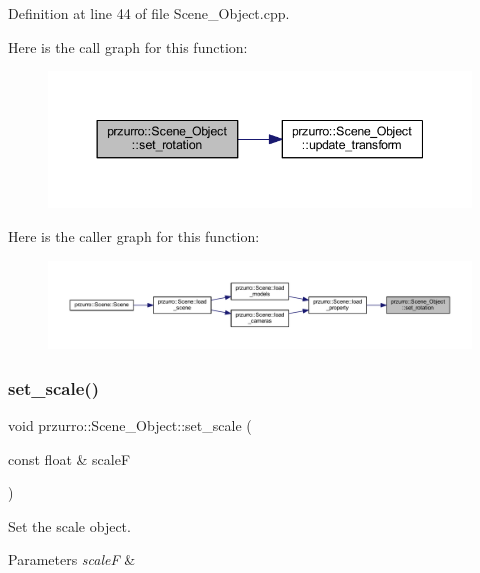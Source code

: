 Definition at line 44 of file Scene\+\_\+\+Object.\+cpp.

Here is the call graph for this function\+:
\nopagebreak
\begin{figure}[H]
\begin{center}
\leavevmode
\includegraphics[width=344pt]{d9/d84/classprzurro_1_1_scene___object_afda0a69deccf91508a1781418d2c3497_cgraph}
\end{center}
\end{figure}
Here is the caller graph for this function\+:
\nopagebreak
\begin{figure}[H]
\begin{center}
\leavevmode
\includegraphics[width=350pt]{d9/d84/classprzurro_1_1_scene___object_afda0a69deccf91508a1781418d2c3497_icgraph}
\end{center}
\end{figure}
\mbox{\label{classprzurro_1_1_scene___object_a76e1fb5b58218b916a45c04101186ac7}} 
\subsubsection{\texorpdfstring{set\_scale()}{set\_scale()}}
{\footnotesize\ttfamily void przurro\+::\+Scene\+\_\+\+Object\+::set\+\_\+scale (\begin{DoxyParamCaption}\item[{const float \&}]{scaleF }\end{DoxyParamCaption})}



Set the scale object. 


\begin{DoxyParams}{Parameters}
{\em scaleF} & \\
\hline
\end{DoxyParams}


